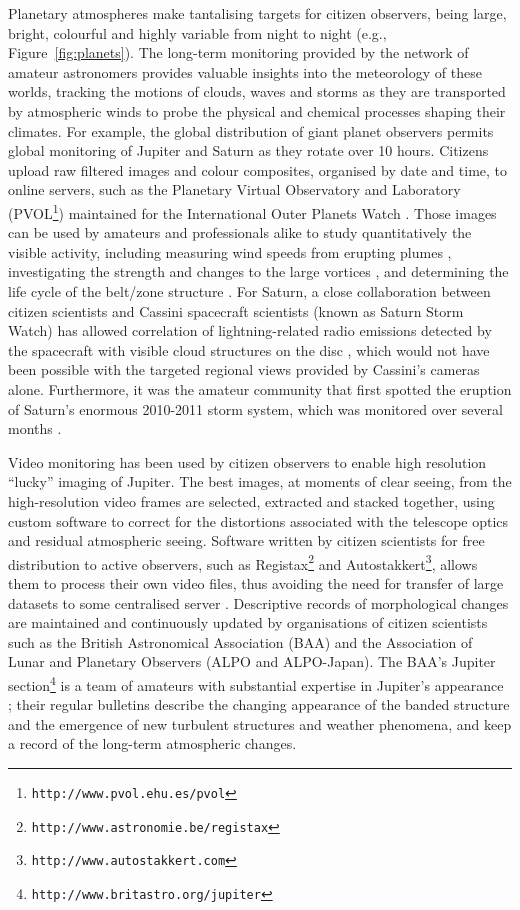 \documentclass{ar2e}
\def\Fref#1{Figure~\ref{#1}\xspace}
\def\CaseStudy#1{\noindent{\it\bf #1 \,\,\,\,}}
\def\url#1{\texttt{#1}}
\begin{document}
\CaseStudy{Long timescale planet monitoring.}
Planetary atmospheres make tantalising targets for citizen observers, being
large, bright, colourful and highly variable from night to night (e.g., 
\Fref{fig:planets}).  The long-term monitoring provided by the network of
amateur astronomers provides valuable insights into the meteorology of these
worlds, tracking the motions of clouds, waves and storms as they are
transported by atmospheric winds to probe the physical and chemical processes
shaping their climates.  For example, the global distribution of giant planet
observers permits global monitoring of Jupiter and Saturn as they rotate over
10 hours. Citizens upload raw filtered images and colour composites, organised
by date and time, to online servers, such as the Planetary Virtual Observatory
and Laboratory (PVOL\footnote{\url{http://www.pvol.ehu.es/pvol}}) maintained
for the International Outer Planets Watch \citep[IOPW][]{10hueso}.  Those
images can be used by amateurs and professionals alike to study quantitatively
the visible activity, including  measuring wind speeds from erupting plumes
\citep{08sanchez}, investigating the strength and changes to the large
vortices \citep[e.g., the 2006 reddening of Jupiter's Oval
BA,][]{06simon-miller}, and determining the life cycle of the belt/zone
structure \citep{96sanchez, 11fletcher_fade}.  For Saturn, a close
collaboration between citizen scientists and Cassini spacecraft scientists
(known as Saturn Storm Watch) has allowed correlation of lightning-related
radio emissions detected by the spacecraft with visible cloud structures on
the disc \citep[e.g.,][]{11fischer}, which would not have been possible with
the targeted regional views provided by Cassini's cameras alone. Furthermore,
it was the amateur community that first spotted the eruption of Saturn's
enormous 2010-2011 storm system, which was monitored over several months
\citep{12sanchez}.

Video monitoring has been used by citizen observers to enable high resolution
``lucky'' imaging of Jupiter. The best images, at moments of clear seeing,
from the high-resolution video frames are selected, extracted and stacked
together, using custom software to correct for the distortions associated with
the telescope optics and residual atmospheric seeing.  Software written by
citizen scientists for free distribution to active observers, such as
Registax\footnote{\url{http://www.astronomie.be/registax}} and
Autostakkert\footnote{\url{http://www.autostakkert.com}},  allows them to
process their own video files, thus avoiding the need for transfer of large
datasets to some centralised server \citep[see][for a thorough
review]{14mousis_proam}.  Descriptive records of morphological changes are
maintained and continuously updated by organisations of citizen scientists
such as the British Astronomical Association (BAA) and the Association of
Lunar and Planetary Observers (ALPO and ALPO-Japan). The BAA's Jupiter
section\footnote{\url{http://www.britastro.org/jupiter}} is a team of amateurs
with substantial expertise in Jupiter's appearance \citep{95rogers};  their
regular bulletins describe the changing appearance of the banded structure and
the emergence of new turbulent structures and weather phenomena, and keep a
record of the long-term atmospheric changes.  
\end{document}
